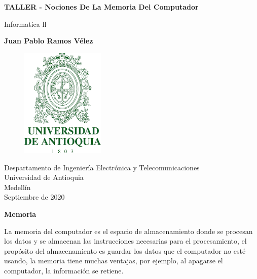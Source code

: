 \documentclass{article}
\begin{document}
\begin{titlepage}
    \begin{center}
        \vspace*{1cm}
            
        \Huge
        \textbf{TALLER - Nociones De La Memoria Del Computador}
            
        \vspace{1cm}
        \LARGE
        Informatica ll
            
        \vspace{1.5cm}
            
        \textbf{Juan Pablo Ramos Vélez}
            
        \vfill
        \begin{figure}[h]
        \includegraphics[width=4cm]{UdeA logo.png}
        \centering
        \label{fig:UdeA logo}
        \end{figure}  
            
        \vspace{1.5cm}
            
        \Large
        Despartamento de Ingeniería Electrónica y Telecomunicaciones\\
        Universidad de Antioquia\\
        Medellín\\
        Septiembre de 2020
            
    \end{center}
\end{titlepage}

\begin{center}
    \bf{\sc\Huge Memoria }\\
\end{center}


\vspace{1cm}

\large
La memoria del computador es el espacio de almacenamiento donde se procesan los datos y se almacenan las instrucciones necesarias para el procesamiento, el propósito del almacenamiento es guardar los datos que el computador no esté usando, la memoria tiene muchas ventajas, por ejemplo, al apagarse el computador, la información se retiene. 
\end{document}
